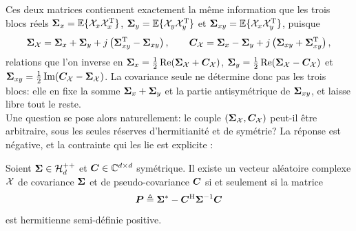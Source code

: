 Ces deux matrices contiennent exactement la même information que les trois blocs réels $\boldsymbol{\Sigma}_x=\operatorname{\mathbb{E}}\{\mathcal{X}_x\mathcal{X}_x^{\mathrm{T}}\}$, $\boldsymbol{\Sigma}_y=\operatorname{\mathbb{E}}\{\mathcal{X}_y\mathcal{X}_y^{\mathrm{T}}\}$ et $\boldsymbol{\Sigma}_{xy}=\operatorname{\mathbb{E}}\{\mathcal{X}_x\mathcal{X}_y^{\mathrm{T}}\}$, puisque
\begin{equation}
  \boldsymbol{\Sigma}_{\mathcal{X}} = \boldsymbol{\Sigma}_x + \boldsymbol{\Sigma}_y + j\left(\boldsymbol{\Sigma}_{xy}^{\mathrm{T}} - \boldsymbol{\Sigma}_{xy}\right),
  \qquad
  \boldsymbol{C}_{\mathcal{X}} = \boldsymbol{\Sigma}_x - \boldsymbol{\Sigma}_y + j\left(\boldsymbol{\Sigma}_{xy} + \boldsymbol{\Sigma}_{xy}^{\mathrm{T}}\right),
  \label{eq:context-complex-blocs}
\end{equation}
relations que l'on inverse en $\boldsymbol{\Sigma}_x = \frac12\operatorname{\operatorname{Re}}(\boldsymbol{\Sigma}_{\mathcal{X}}+\boldsymbol{C}_{\mathcal{X}})$, $\boldsymbol{\Sigma}_y = \frac12\operatorname{\operatorname{Re}}(\boldsymbol{\Sigma}_{\mathcal{X}}-\boldsymbol{C}_{\mathcal{X}})$ et $\boldsymbol{\Sigma}_{xy} = \frac12\operatorname{\operatorname{Im}}(\boldsymbol{C}_{\mathcal{X}}-\boldsymbol{\Sigma}_{\mathcal{X}})$. La covariance seule ne détermine donc pas les trois blocs: elle en fixe la somme $\boldsymbol{\Sigma}_x+\boldsymbol{\Sigma}_y$ et la partie antisymétrique de $\boldsymbol{\Sigma}_{xy}$, et laisse libre tout le reste. \\

Une question se pose alors naturellement: le couple $(\boldsymbol{\Sigma}_{\mathcal{X}},\boldsymbol{C}_{\mathcal{X}})$ peut-il être arbitraire, sous les seules réserves d'hermitianité et de symétrie? La réponse est négative, et la contrainte qui les lie est explicite :

\begin{proposition}
\label{prop:context-complex-picinbono}
  Soient $\boldsymbol{\Sigma}\in\mathcal{H}_{d}^{++}$ et $\boldsymbol{C}\in\mathbb{C}^{d\times d}$ symétrique. Il existe un vecteur aléatoire complexe $\mathcal{X}$ de covariance $\boldsymbol{\Sigma}$ et de pseudo-covariance $\boldsymbol{C}$ si et seulement si la matrice
\begin{equation}
  \boldsymbol{P} \triangleq {\boldsymbol{\Sigma}}^{*} - \boldsymbol{C}^{\mathrm{H}}{\boldsymbol{\Sigma}}^{-1}\boldsymbol{C}
  \label{eq:context-complex-picinbono}
\end{equation}
  est hermitienne semi-définie positive.
\end{proposition}

